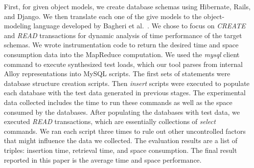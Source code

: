 \documentclass[10pt,conference]{IEEEtran}
\begin{document}
First, for given object models, we create database schemas using Hibernate, Rails, and Django. We then translate each one of the give models to the object-modeling language developed by Bagheri et al.~\cite{trademaker}. We chose to focus on \emph{CREATE} and \emph{READ} transactions for dynamic analysis of time performance of the target schemas. We wrote instrumentation code to return the desired time and space consumption data into the MapReduce computation. We used the \emph{mysql} client command to execute synthesized test loads, which our tool parses from internal Alloy representations into MySQL scripts. The first sets of statements were database structure creation scripts. Then \emph{insert} scripts were executed to populate each database with the test data generated in previous stages. The experimental data collected includes the time to run these commands as well as the space consumed by the databases. After populating the databases with test data, we executed \emph{READ} transactions, which are essentially collections of \emph{select} commands.  We ran each script three times to rule out other uncontrolled factors that might influence the data we collected. The evaluation results are a list of triples: insertion time, retrieval time, and space consumption. The final result reported in this paper is the average time and space performance.


 



\end{document}
